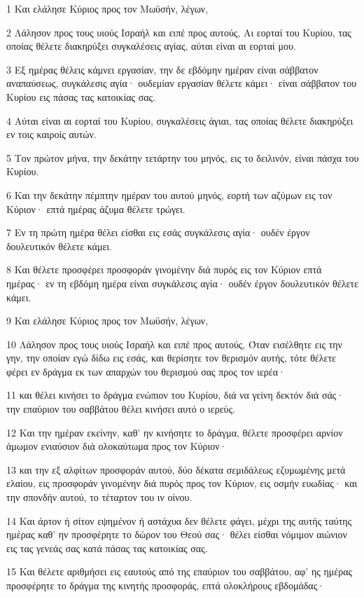 \par 1 Και ελάλησε Κύριος προς τον Μωϋσήν, λέγων,
\par 2 Λάλησον προς τους υιούς Ισραήλ και ειπέ προς αυτούς, Αι εορταί του Κυρίου, τας οποίας θέλετε διακηρύξει συγκαλέσεις αγίας, αύται είναι αι εορταί μου.
\par 3 Εξ ημέρας θέλεις κάμνει εργασίαν, την δε εβδόμην ημέραν είναι σάββατον αναπαύσεως, συγκάλεσις αγία· ουδεμίαν εργασίαν θέλετε κάμει· είναι σάββατον του Κυρίου εις πάσας τας κατοικίας σας.
\par 4 Αύται είναι αι εορταί του Κυρίου, συγκαλέσεις άγιαι, τας οποίας θέλετε διακηρύξει εν τοις καιροίς αυτών.
\par 5 Τον πρώτον μήνα, την δεκάτην τετάρτην του μηνός, εις το δειλινόν, είναι πάσχα του Κυρίου.
\par 6 Και την δεκάτην πέμπτην ημέραν του αυτού μηνός, εορτή των αζύμων εις τον Κύριον· επτά ημέρας άζυμα θέλετε τρώγει.
\par 7 Εν τη πρώτη ημέρα θέλει είσθαι εις εσάς συγκάλεσις αγία· ουδέν έργον δουλευτικόν θέλετε κάμει.
\par 8 Και θέλετε προσφέρει προσφοράν γινομένην διά πυρός εις τον Κύριον επτά ημέρας· εν τη εβδόμη ημέρα είναι συγκάλεσις αγία· ουδέν έργον δουλευτικόν θέλετε κάμει.
\par 9 Και ελάλησε Κύριος προς τον Μωϋσήν, λέγων,
\par 10 Λάλησον προς τους υιούς Ισραήλ και ειπέ προς αυτούς, Όταν εισέλθητε εις την γην, την οποίαν εγώ δίδω εις εσάς, και θερίσητε τον θερισμόν αυτής, τότε θέλετε φέρει εν δράγμα εκ των απαρχών του θερισμού σας προς τον ιερέα·
\par 11 και θέλει κινήσει το δράγμα ενώπιον του Κυρίου, διά να γείνη δεκτόν διά σάς· την επαύριον του σαββάτου θέλει κινήσει αυτό ο ιερεύς.
\par 12 Και την ημέραν εκείνην, καθ' ην κινήσητε το δράγμα, θέλετε προσφέρει αρνίον άμωμον ενιαύσιον διά ολοκαύτωμα προς τον Κύριον·
\par 13 και την εξ αλφίτων προσφοράν αυτού, δύο δέκατα σεμιδάλεως εζυμωμένης μετά ελαίου, εις προσφοράν γινομένην διά πυρός προς τον Κύριον, εις οσμήν ευωδίας· και την σπονδήν αυτού, το τέταρτον του ιν οίνου.
\par 14 Και άρτον ή σίτον εψημένον ή αστάχυα δεν θέλετε φάγει, μέχρι της αυτής ταύτης ημέρας καθ' ην προσφέρητε το δώρον του Θεού σας· θέλει είσθαι νόμιμον αιώνιον εις τας γενεάς σας κατά πάσας τας κατοικίας σας.
\par 15 Και θέλετε αριθμήσει εις εαυτούς από της επαύριον του σαββάτου, αφ' ης ημέρας προσφέρητε το δράγμα της κινητής προσφοράς, επτά ολοκλήρους εβδομάδας·
